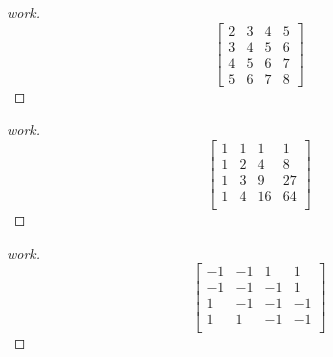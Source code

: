 \documentclass{article}
\begin{document}
\begin{enumerate}
{    \begin{enumerate}
        \begin{proof}[work]
            \[
                \begin{bmatrix}
                    2 & 3 & 4 & 5 \\
                    3 & 4 & 5 & 6 \\
                    4 & 5 & 6 & 7 \\
                    5 & 6 & 7 & 8
                \end{bmatrix}
            \]
        \end{proof}
        \begin{proof}[work]
            \[
                \begin{bmatrix}
                    1 & 1 & 1  & 1  \\
                    1 & 2 & 4  & 8  \\
                    1 & 3 & 9  & 27 \\
                    1 & 4 & 16 & 64 \\
                \end{bmatrix}
            \]
        \end{proof}
        \begin{proof}[work]
            \[
                \begin{bmatrix}
                    -1 & -1 & 1  & 1  \\
                    -1 & -1 & -1 & 1  \\
                    1  & -1 & -1 & -1 \\
                    1  & 1  & -1 & -1 \\
                \end{bmatrix}
            \]
        \end{proof}
    \end{enumerate}}
\end{enumerate}
\end{document}
